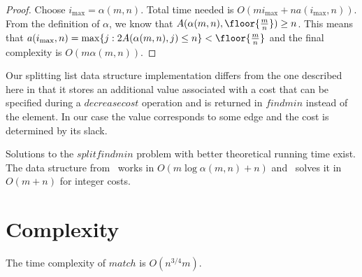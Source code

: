 \begin{proof}
    Choose $i_{\max} = \alpha(m,n)$. Total time needed is $O(mi_{\max} + na(i_{\max},n))$. From the definition of $\alpha$, we know that $A(\alpha(m,n), \floor{\frac{m}{n}}) \geq n$. This means that $a(i_{\max},n) = \max \{ j: 2A(\alpha(m,n), j) \leq n \} < \floor{\frac{m}{n}}$ and the final complexity is $O(m\alpha(m,n))$.
\end{proof}

Our splitting list data structure implementation differs from the one described here in that it stores an additional value associated with a cost that can be specified during a $decreasecost$ operation and is returned in $findmin$ instead of the element. In our case the value corresponds to some edge and the cost is determined by its slack.


Solutions to the $splitfindmin$ problem with better theoretical running time exist. The data structure from~\cite{pettie2005sensitivity} works in $O(m \log \alpha(m, n) + n)$ and~\cite{thorup2007equivalence} solves it in $O(m + n)$ for integer costs.

\section{Complexity}

\begin{theorem}
    The time complexity of $match$ is $O(n^{3/4}m)$.
\end{theorem}


